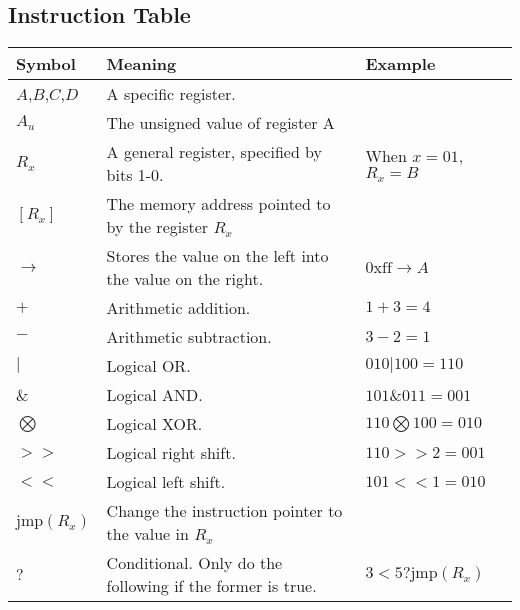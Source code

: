 \documentclass[11pt]{article}
\begin{document}
\subsection{Instruction Table}
\begin{tabular}{l | l | l}
Symbol & Meaning & Example\\
\hline
$A$,$B$,$C$,$D$ & A specific register.\\
$A_u$ & The unsigned value of register A & \\
$R_x$ & A general register, specified by bits 1-0. & When $x=01$, $R_x = B$\\
$[R_x]$ & The memory address pointed to by the register $R_x$ &\\
$\rightarrow$ & Stores the value on the left into the value on the right. & $\mathrm{0xff} \rightarrow A$\\
$+$ & Arithmetic addition. & $1 + 3 = 4$\\
$-$ & Arithmetic subtraction. & $3 - 2 = 1$\\
$|$ & Logical OR. & $010 | 100 = 110$\\
$\&$ & Logical AND. & $101 \& 011 = 001$\\
$\bigotimes$ & Logical XOR. & $110 \bigotimes 100 = 010$\\
$>>$ & Logical right shift.& $110 >> 2 = 001$\\
$<<$ & Logical left shift. & $101 << 1 = 010$\\
$\mathrm{jmp}(R_x)$ & Change the instruction pointer to the value in $R_x$&\\
$?$ & Conditional. Only do the following if the former is true.& $3 < 5 ? \mathrm{jmp}(R_x)$\\

\end{tabular}
\end{document}
